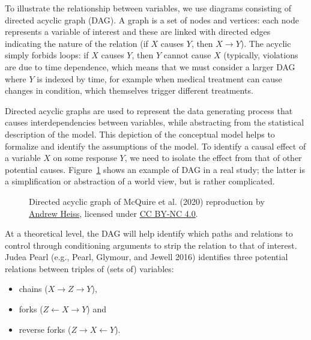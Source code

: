 \documentclass[
  11pt,
  letterpaper,
]{scrbook}
\providecommand{\tightlist}{%
  \setlength{\itemsep}{0pt}\setlength{\parskip}{0pt}}\usepackage{longtable,booktabs,array}
\theoremstyle{definition}
\theoremstyle{definition}
\theoremstyle{remark}
\begin{document}
To illustrate the relationship between variables, we use diagrams
consisting of directed acyclic graph (DAG). A graph is a set of nodes
and vertices: each node represents a variable of interest and these are
linked with directed edges indicating the nature of the relation (if
\(X\) causes \(Y\), then \(X \to Y\)). The acyclic simply forbids loops:
if \(X\) causes \(Y\), then \(Y\) cannot cause \(X\) (typically,
violations are due to time dependence, which means that we must consider
a larger DAG where \(Y\) is indexed by time, for example when medical
treatment can cause changes in condition, which themselves trigger
different treatments.

Directed acyclic graphs are used to represent the data generating
process that causes interdependencies between variables, while
abstracting from the statistical description of the model. This
depiction of the conceptual model helps to formalize and identify the
assumptions of the model. To identify a causal effect of a variable
\(X\) on some response \(Y\), we need to isolate the effect from that of
other potential causes. Figure~\ref{fig-daggity} shows an example of DAG
in a real study; the latter is a simplification or abstraction of a
world view, but is rather complicated.

\begin{figure}[ht!]


\caption{\label{fig-daggity}Directed acyclic graph of McQuire et al.
(2020) reproduction by \href{https://www.andrewheiss.com/}{Andrew
Heiss}, licensed under
\href{https://creativecommons.org/licenses/by-nc/4.0/}{CC BY-NC 4.0}.}

\end{figure}%

At a theoretical level, the DAG will help identify which paths and
relations to control through conditioning arguments to strip the
relation to that of interest. Judea Pearl (e.g., Pearl, Glymour, and
Jewell 2016) identifies three potential relations between triples of
(sets of) variables:

\begin{itemize}
\tightlist
\item
  chains (\(X \to Z\to Y\)),
\item
  forks (\(Z \leftarrow X \rightarrow Y\)) and
\item
  reverse forks (\(Z \rightarrow X \leftarrow Y\)).
\end{itemize}
\end{document}
